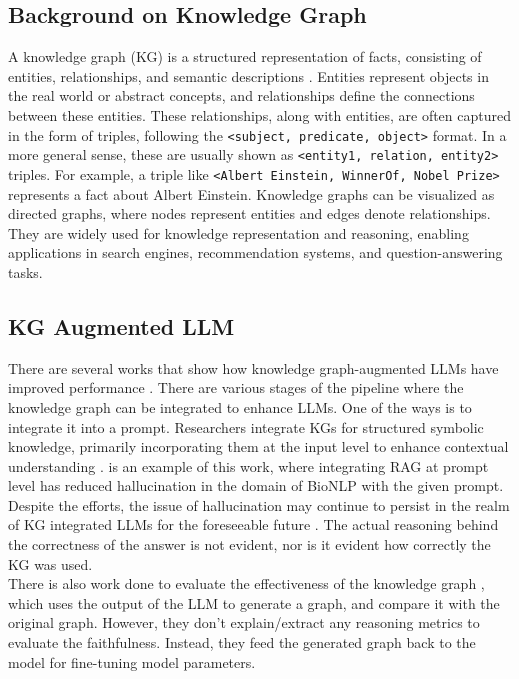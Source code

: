 \documentclass[11pt,a4paper]{article}
\begin{document}
\subsection{Background on Knowledge Graph} A knowledge graph (KG) is a structured representation of facts, consisting of entities, relationships, and semantic descriptions \cite{ji2021survey}. Entities represent objects in the real world or abstract concepts, and relationships define the connections between these entities. These relationships, along with entities, are often captured in the form of triples, following the \texttt{<subject, predicate, object>} format. In a more general sense, these are usually shown as \texttt{<entity1, relation, entity2>} triples. For example, a triple like \texttt{<Albert Einstein, WinnerOf, Nobel Prize>} represents a fact about Albert Einstein. Knowledge graphs can be visualized as directed graphs, where nodes represent entities and edges denote relationships. They are widely used for knowledge representation and reasoning, enabling applications in search engines, recommendation systems, and question-answering tasks. 

\subsection{KG Augmented LLM} There are several works that show how knowledge graph-augmented LLMs have improved performance \cite{agrawal2023can}. There are various stages of the pipeline where the knowledge graph can be integrated to enhance LLMs. One of the ways is to integrate it into a prompt. Researchers integrate KGs for structured symbolic knowledge, primarily incorporating them at the input level to enhance contextual understanding \cite{agrawal2023can}. \cite{soman2024biomedical} is an example of this work, where integrating RAG at prompt level has reduced hallucination in the domain of BioNLP with the given prompt. Despite the efforts, the issue of hallucination may continue to persist in the realm of KG integrated LLMs for the foreseeable future \cite{pan2024unifying}. The actual reasoning behind the correctness of the answer is not evident, nor is it evident how correctly the KG was used. \\

\noindent There is also work done to evaluate the effectiveness of the knowledge graph \cite{jiang2024efficient}, which uses the output of the LLM to generate a graph, and compare it with the original graph. However, \cite{jiang2024efficient} they don’t explain/extract any reasoning metrics to evaluate the faithfulness. Instead, they feed the generated graph back to the model for fine-tuning model parameters. 
\end{document}
